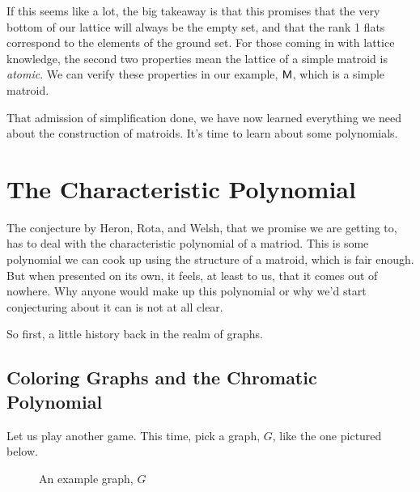 \documentclass[12pt,oneside]{../../sfsuthesis}
\begin{document}
If this seems like a lot, the big takeaway is that this promises that the very bottom of our lattice will always be the empty set, and that the rank 1 flats correspond to the elements of the ground set.
For those coming in with lattice knowledge, the second two properties mean the lattice of a simple matroid is \emph{atomic}.
We can verify these properties in our example, \( \mathsf{M} \), which is a simple matroid.

That admission of simplification done, we have now learned everything we need about the construction of matroids.
It's time to learn about some polynomials.

\section{The Characteristic Polynomial}

The conjecture by Heron, Rota, and Welsh, that we promise we are getting to, has to deal with the characteristic polynomial of a matriod.
This is some polynomial we can cook up using the structure of a matroid, which is fair enough.
But when presented on its own, it feels, at least to us, that it comes out of nowhere.
Why anyone would make up this polynomial or why we'd start conjecturing about it can is not at all clear.

So first, a little history back in the realm of graphs.

\subsection{Coloring Graphs and the Chromatic Polynomial}

Let us play another game.
This time, pick a graph, \( G \), like the one pictured below.

\begin{figure}[H]
    \centering
    \caption{An example graph, \(G\)}
\end{figure}
\end{document}
